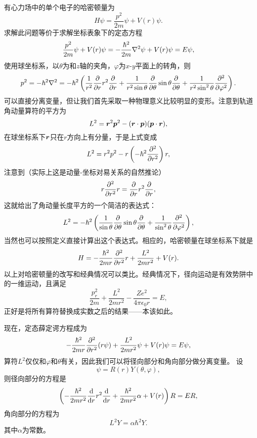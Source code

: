 有心力场中的单个电子的哈密顿量为
\begin{equation}
    {H} \psi = \frac{{p}^2}{2m} \psi + V(r) \psi.
\end{equation}
求解此问题等价于求解坐标表象下的定态方程
\begin{equation}
    \frac{{p}^2}{2m} \psi + V(r) \psi = - \frac{\hbar^2}{2m} \laplacian \psi + V(r) \psi = E \psi,
    \label{eq:centered-force-eq}
\end{equation}
使用球坐标系，以$\theta$为和$z$轴的夹角，$\varphi$为$x$-$y$平面上的转角，则
\[
    {p}^2 = -\hbar^2 \laplacian = - \hbar^2 \left( \frac{1}{r^2} \pdv{r} r^2 \pdv{r} + \frac{1}{r^2 \sin \theta} \pdv{\theta} \sin \theta \pdv{\theta} + \frac{1}{r^2 \sin^2 \theta} \pdv[2]{\varphi} \right) .
\]
可以直接分离变量，但让我们首先采取一种物理意义比较明显的变形。注意到轨道角动量算符的平方为
\[
    {L}^2 = {\vb*{r}}^2 {\vb*{p}}^2 - ({\vb*{r}} \cdot {\vb*{p}}) ({\vb*{p}} \cdot {\vb*{r}}),
\]
在球坐标系下$\vb*{r}$只在$r$方向上有分量，于是上式变成
\[
    {L}^2 = r^2 {p}^2 - r \left( - \hbar^2 \pdv[2]{r} \right) r,
\]
注意到（实际上这是动量-坐标对易关系的自然推论）
\[
    r \pdv[2]{r} r = \pdv{r} r^2 \pdv{r},
\]
这就给出了角动量长度平方的一个简洁的表达式：
\begin{equation}
    {L}^2 = - \hbar^2 \left( \frac{1}{\sin \theta} \pdv{\theta} \sin \theta \pdv{\theta} + \frac{1}{\sin^2 \theta} \pdv[2]{\varphi} \right),
\end{equation}
当然也可以按照定义直接计算出这个表达式。相应的，哈密顿量在球坐标系下就是
\[
    {H} = - \frac{\hbar^2}{2 m r} \pdv[2]{r} r + \frac{{L}^2}{2 m r^2} + V(r).
\]
以上对哈密顿量的改写和经典情况可以类比。经典情况下，径向运动是有效势阱中的一维运动，且满足
\[
    \frac{p_r^2}{2m} + \frac{L^2}{2mr^2} - \frac{Ze^2}{4\pi \epsilon_0 r} = E,
\]
正好是将所有算符替换成实数之后的结果——本该如此。

现在，定态薛定谔方程成为
\[
    - \frac{\hbar^2}{2 m r} \pdv[2]{r} (r \psi) + \frac{{L}^2}{2 m r^2} \psi + V(r) \psi = E \psi,
\]
算符${L}^2$仅仅和$\varphi$和$\theta$有关，因此我们可以将径向部分和角向部分做分离变量。
设
\[
    \psi = R(r) Y(\theta, \varphi),
\]
则径向部分的方程是
\begin{equation}
    \left( - \frac{\hbar^2}{2m r^2} \dv{r} r^2 \dv{r} + \frac{\hbar^2}{2m r^2} \alpha + V(r) \right) R = E R,
    \label{eq:original-r-equation}
\end{equation}
角向部分的方程为
\begin{equation}
    {L}^2 Y = \alpha \hbar^2 Y.
    \label{eq:angle-equation}
\end{equation}
其中$\alpha$为常数。

